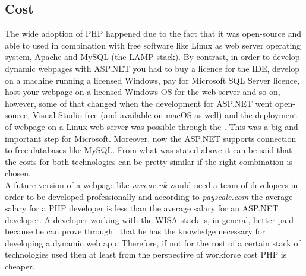 \documentclass[11]{article}
\begin{document}
	

	\subsection{Cost}
	The wide adoption of PHP happened due to the fact that it was open-source and able to used in combination with free software like Linux as web server operating system, Apache and MySQL (the LAMP stack). By contrast, in order to develop dynamic webpages with ASP.NET you had to buy a licence for the IDE, develop on a machine running a licensed Windows, pay for Microsoft SQL Server licence, host your webpage on a licensed Windows OS for the  web server and so on, however, some of that changed when the development for ASP.NET went open-source, Visual Studio free (and available on macOS as well) and the deployment of webpage on a Linux web server was possible through the \cite{Mono}. This was a big and important step for Microsoft. Moreover, now the ASP.NET supports connection to free databases like MySQL. From what was stated above it can be said that the costs for both technologies can be pretty similar if the right combination is chosen.\\
	\indent
	A future version of a webpage like \textit{uws.ac.uk} would need a team of developers in order to be developed professionally and according to \textit{payscale.com} the average salary for a PHP developer is less than the average salary for an ASP.NET developer. A developer working with the WISA stack is, in general, better paid because he can prove through~\cite{MScert} that he has the knowledge necessary for developing a dynamic web app. Therefore, if not for the cost of a certain stack of technologies used then at least from the perspective of workforce cost PHP is cheaper.
\end{document}
